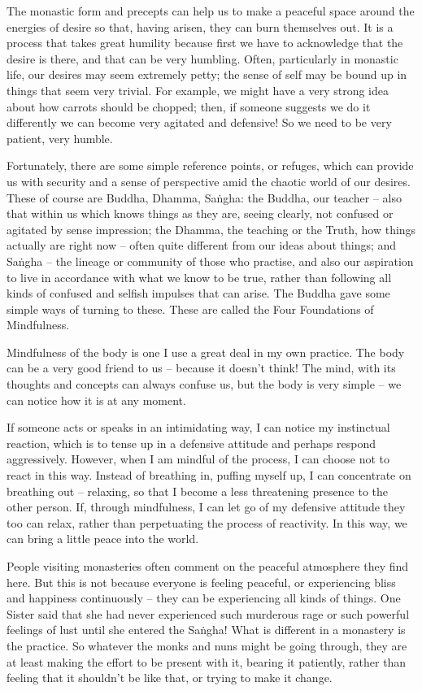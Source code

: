 The monastic form and precepts can help us to make a peaceful space around the energies of desire so that, having arisen, they can burn themselves out. It is a process that takes great humility because first we have to acknowledge that the desire is there, and that can be very humbling. Often, particularly in monastic life, our desires may seem extremely petty; the sense of self may be bound up in things that seem very trivial. For example, we might have a very strong idea about how carrots should be chopped; then, if someone suggests we do it differently we can become very agitated and defensive! So we need to be very patient, very humble. 

Fortunately, there are some simple reference points, or refuges, which can provide us with security and a sense of perspective amid the chaotic world of our desires. These of course are Buddha, Dhamma, Sa\.ngha: the Buddha, our teacher -- also that within us which knows things as they are, seeing clearly, not confused or agitated by sense impression; the Dhamma, the teaching or the Truth, how things actually are right now -- often quite different from our ideas about things; and Sa\.ngha -- the lineage or community of those who practise, and also our aspiration to live in accordance with what we know to be true, rather than following all kinds of confused and selfish impulses that can arise. The Buddha gave some simple ways of turning to these. These are called the Four Foundations of Mindfulness.

Mindfulness of the body is one I use a great deal in my own practice. The body can be a very good friend to us -- because it doesn't think! The mind, with its thoughts and concepts can always confuse us, but the body is very simple -- we can notice how it is at any moment. 

If someone acts or speaks in an intimidating way, I can notice my instinctual reaction, which is to tense up in a defensive attitude and perhaps respond aggressively. However, when I am mindful of the process, I can choose not to react in this way. Instead of breathing in, puffing myself up, I can concentrate on breathing out -- relaxing, so that I become a less threatening presence to the other person. If, through mindfulness, I can let go of my defensive attitude they too can relax, rather than perpetuating the process of reactivity. In this way, we can bring a little peace into the world.

People visiting monasteries often comment on the peaceful atmosphere they find here. But this is not because everyone is feeling peaceful, or experiencing bliss and happiness continuously -- they can be experiencing all kinds of things. One Sister said that she had never experienced such murderous rage or such powerful feelings of lust until she entered the Sa\.ngha! What is different in a monastery is the practice. So whatever the monks and nuns might be going through, they are at least making the effort to be present with it, bearing it patiently, rather than feeling that it shouldn't be like that, or trying to make it change.

